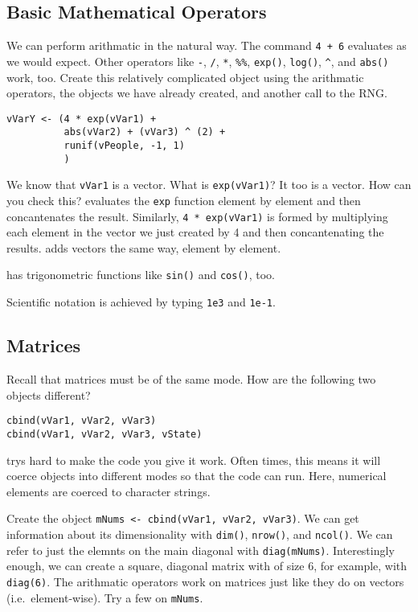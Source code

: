 \subsection{Basic Mathematical Operators}
We can perform arithmatic in the natural way. The command \texttt{4 +
  6} evaluates as we would expect. Other operators like \texttt{-},
\texttt{/}, \texttt{*}, \texttt{\%\%}, \texttt{exp()}, \texttt{log()},
\texttt{\^}, and \texttt{abs()} work, too. Create this relatively
complicated object using the arithmatic operators, the objects we have
already created, and another call to the RNG.
\begin{verbatim}
vVarY <- (4 * exp(vVar1) + 
          abs(vVar2) + (vVar3) ^ (2) + 
          runif(vPeople, -1, 1)
          )
\end{verbatim}
We know that \texttt{vVar1} is a vector. What is \texttt{exp(vVar1)}?
It too is a vector. How can you check this? \R{} evaluates the
\texttt{exp} function element by element and then concantenates the
result. Similarly, \texttt{4 * exp(vVar1)} is formed by multiplying
each element in the vector we just created by 4 and then
concantenating the results. \R{} adds vectors the same way, element by
element.

\R{} has trigonometric functions like \texttt{sin()} and
\texttt{cos()}, too.

Scientific notation is achieved by typing \texttt{1e3} and
\texttt{1e-1}.

\subsection{Matrices}

Recall that matrices must be of the same mode. How are the following
two objects different? 
\begin{verbatim}
cbind(vVar1, vVar2, vVar3)
cbind(vVar1, vVar2, vVar3, vState)
\end{verbatim}

\R{} trys hard to make the code you give it work. Often times, this
means it will coerce objects into different modes so that the code can
run. Here, numerical elements are coerced to character strings.

Create the object \verb=mNums <- cbind(vVar1, vVar2, vVar3)=. We can
get information about its dimensionality with \texttt{dim()},
\texttt{nrow()}, and \texttt{ncol()}. We can refer to just the elemnts on
the main diagonal with \texttt{diag(mNums)}. Interestingly enough, we
can create a square, diagonal matrix with of size 6, for example, with
\texttt{diag(6)}. The arithmatic operators work on matrices just like
they do on vectors (i.e.\ element-wise). Try a few on \texttt{mNums}.

